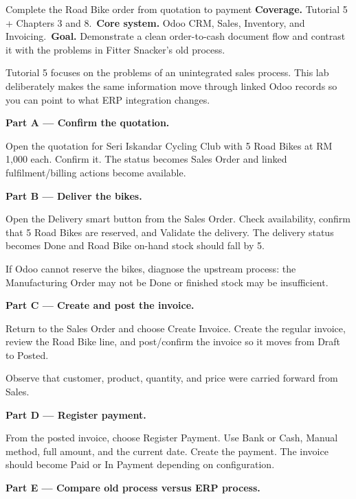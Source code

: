 
\begin{labproject}{Complete the Road Bike order from quotation to payment}
\textbf{Coverage.} Tutorial 5 + Chapters 3 and 8.\
\textbf{Core system.} Odoo CRM, Sales, Inventory, and Invoicing.\
\textbf{Goal.} Demonstrate a clean order-to-cash document flow and contrast it with the problems in Fitter Snacker's old process.

\begin{labmode}
Tutorial 5 focuses on the problems of an unintegrated sales process. This lab deliberately makes the same information move through linked Odoo records so you can point to what ERP integration changes.
\end{labmode}

\medskip\noindent\textbf{Part A --- Confirm the quotation.}

Open the quotation for Seri Iskandar Cycling Club with 5 Road Bikes at RM 1,000 each. Confirm it. The status becomes Sales Order and linked fulfilment/billing actions become available.

\medskip\noindent\textbf{Part B --- Deliver the bikes.}

Open the Delivery smart button from the Sales Order. Check availability, confirm that 5 Road Bikes are reserved, and Validate the delivery. The delivery status becomes Done and Road Bike on-hand stock should fall by 5.

If Odoo cannot reserve the bikes, diagnose the upstream process: the Manufacturing Order may not be Done or finished stock may be insufficient.

\medskip\noindent\textbf{Part C --- Create and post the invoice.}

Return to the Sales Order and choose Create Invoice. Create the regular invoice, review the Road Bike line, and post/confirm the invoice so it moves from Draft to Posted.

Observe that customer, product, quantity, and price were carried forward from Sales.

\medskip\noindent\textbf{Part D --- Register payment.}

From the posted invoice, choose Register Payment. Use Bank or Cash, Manual method, full amount, and the current date. Create the payment. The invoice should become Paid or In Payment depending on configuration.

\medskip\noindent\textbf{Part E --- Compare old process versus ERP process.}


\end{labproject}
